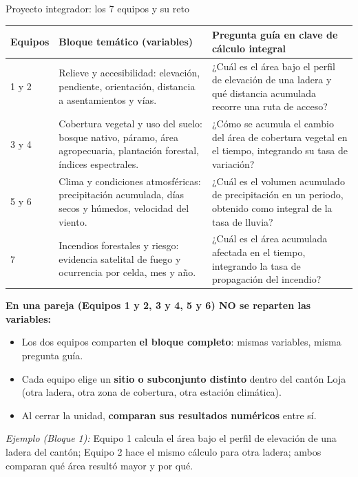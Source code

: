 \documentclass[aspectratio=169,11pt]{beamer}
\begin{document}
\begin{frame}{Proyecto integrador: los 7 equipos y su reto}
\tiny
\renewcommand{\arraystretch}{1.0}
\begin{tabularx}{\textwidth}{C{1.6cm}L{2.9cm}Y}
\toprule
\textbf{Equipos} & \textbf{Bloque temático (variables)} & \textbf{Pregunta guía en clave de cálculo integral} \\
 y 2 & Relieve y accesibilidad: elevación, pendiente, orientación, distancia a asentamientos y vías. & ¿Cuál es el área bajo el perfil de elevación de una ladera y qué distancia acumulada recorre una ruta de acceso? \\
3 y 4 & Cobertura vegetal y uso del suelo: bosque nativo, páramo, área agropecuaria, plantación forestal, índices espectrales. & ¿Cómo se acumula el cambio del área de cobertura vegetal en el tiempo, integrando su tasa de variación? \\
5 y 6 & Clima y condiciones atmosféricas: precipitación acumulada, días secos y húmedos, velocidad del viento. & ¿Cuál es el volumen acumulado de precipitación en un periodo, obtenido como integral de la tasa de lluvia? \\
7 & Incendios forestales y riesgo: evidencia satelital de fuego y ocurrencia por celda, mes y año. & ¿Cuál es el área acumulada afectada en el tiempo, integrando la tasa de propagación del incendio? \\
\bottomrule
\end{tabularx}
\vspace{0.1cm}
\begin{keybox}[top=2pt,bottom=2pt]
\textbf{En una pareja (Equipos 1 y 2, 3 y 4, 5 y 6) NO se reparten las variables:}
\begin{itemize}[itemsep=0.5pt,topsep=1pt]
  \item Los dos equipos comparten \textbf{el bloque completo}: mismas variables, misma pregunta guía.
  \item Cada equipo elige un \textbf{sitio o subconjunto distinto} dentro del cantón Loja (otra ladera, otra zona de cobertura, otra estación climática).
  \item Al cerrar la unidad, \textbf{comparan sus resultados numéricos} entre sí.
\end{itemize}
\textit{Ejemplo (Bloque 1):} Equipo 1 calcula el área bajo el perfil de elevación de una ladera del cantón; Equipo 2 hace el mismo cálculo para otra ladera; ambos comparan qué área resultó mayor y por qué.
\end{keybox}
\end{frame}
\end{document}
